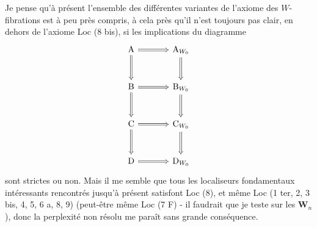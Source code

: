 Je pense qu'à présent l'ensemble des différentes variantes de l'axiome des $W$-fibrations est à peu près compris, à cela près qu'il n'est toujours pas clair, en dehors de l'axiome Loc (8 bis), si les implications du diagramme
\[
\begin{tikzcd}[row sep=large, column sep=large]
\mathrm{A} \arrow[r, Rightarrow] \arrow[d, Rightarrow] & \mathrm{A}_{W_0} \arrow[d, Rightarrow] \\
\mathrm{B} \arrow[r, Rightarrow] \arrow[d, Rightarrow] & \mathrm{B}_{W_0} \arrow[d, Rightarrow] \\
\mathrm{C} \arrow[r, Rightarrow] \arrow[d, Rightarrow] & \mathrm{C}_{W_0} \arrow[d, Rightarrow] \\
\mathrm{D} \arrow[r, Rightarrow] & \mathrm{D}_{W_0}
\end{tikzcd}
\]
sont strictes ou non. Mais il me semble que tous les localiseurs fondamentaux intéressants rencontrés jusqu'à présent satisfont Loc (8), et même Loc (1 ter, 2, 3 bis, 4, 5, 6 a, 8, 9) (peut-être même Loc (7 F) - il faudrait que je teste sur les $\mathbf{W}_n$), donc la perplexité non résolu me paraît sans grande conséquence. %


